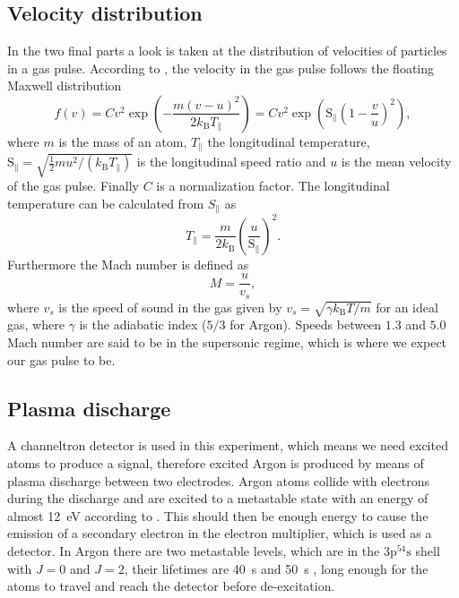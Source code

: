\documentclass[a4paper,10pt]{article}
\begin{document}
\subsection{Velocity distribution}\label{theory}
In the two final parts a look is taken at the distribution of velocities of particles in a gas pulse. According to \cite{bergmann}, the velocity in the gas pulse follows the floating Maxwell distribution 
\begin{equation}\label{floatmaxwell}
	f(v) = C v^2 \exp(- \frac{m (v - u)^2}{2 k_\mathrm{B} T_\parallel}) = C v^2 \exp(\mathrm{S}_\parallel \left(1 - \frac{v}{u}\right)^2),
\end{equation}
where $m$ is the mass of an atom, $T_\parallel$ the longitudinal temperature, $\mathrm{S}_\parallel = \sqrt{\frac{1}{2} m u^2 / (k_{\mathrm{B}} T_\parallel)}$ is the longitudinal speed ratio and $u$ is the mean velocity of the gas pulse. Finally $C$ is a normalization factor. The longitudinal temperature can be calculated from $S_\parallel$  as
\begin{equation}
T_\parallel = \frac{m}{2 k_\mathrm{B}} \left(\frac{u}{\mathrm{S}_\parallel} \right)^2.
\end{equation}
Furthermore the Mach number is defined as 
\[ M = \frac{u}{v_s},\]
where $v_s$ is the speed of sound in the gas given by $v_s = \sqrt{\gamma k_\mathrm{B} T/m}$ for an ideal gas, where $\gamma$ is the adiabatic index ($5/3$ for Argon). Speeds between $1.3$ and $5.0$ Mach number are said to be in the supersonic regime, which is where we expect our gas pulse to be.

\subsection{Plasma discharge}
A channeltron detector is used in this experiment, which means we need excited atoms to produce a signal, therefore excited Argon is produced by means of plasma discharge between two electrodes. Argon atoms collide with electrons during the discharge and are excited to a metastable state with an energy of almost \SI{12}{\electronvolt} according to \cite{script}. This should then be enough energy to cause the emission of a secondary electron in the electron multiplier, which is used as a detector. In Argon there are two metastable levels, which are in the $3\text{p}^54\text{s}$ shell with $J=0$ and $J = 2$, their lifetimes are \SI{40}{\s} and \SI{50}{\s} \cite{lifetime}, long enough for the atoms to travel and reach the detector before de-excitation. 
\end{document}

